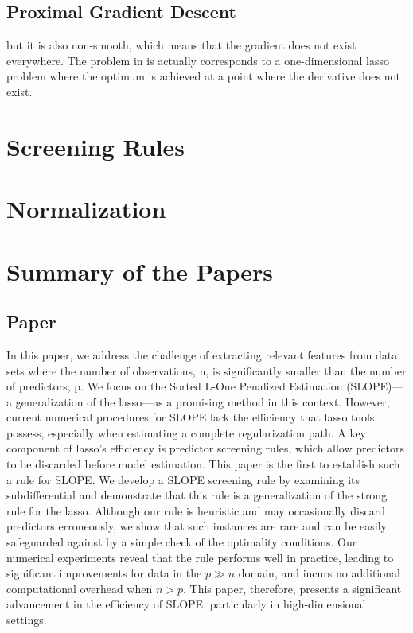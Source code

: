\subsection{Proximal Gradient Descent}

but it is also non-smooth, which means that the gradient does not exist everywhere. The problem in  is actually corresponds to a one-dimensional lasso problem where the optimum is achieved at a point where the derivative does not exist.


\section{Screening Rules}\label{sec:screening-rules}

\section{Normalization}

\section{Summary of the Papers}

\subsection{Paper \I}

In this paper, we address the challenge of extracting relevant features from data sets where the number of observations, n, is significantly smaller than the number of predictors, p. We focus on the Sorted L-One Penalized Estimation (SLOPE)—a generalization of the lasso—as a promising method in this context. However, current numerical procedures for SLOPE lack the efficiency that lasso tools possess, especially when estimating a complete regularization path. A key component of lasso's efficiency is predictor screening rules, which allow predictors to be discarded before model estimation. This paper is the first to establish such a rule for SLOPE. We develop a SLOPE screening rule by examining its subdifferential and demonstrate that this rule is a generalization of the strong rule for the lasso. Although our rule is heuristic and may occasionally discard predictors erroneously, we show that such instances are rare and can be easily safeguarded against by a simple check of the optimality conditions. Our numerical experiments reveal that the rule performs well in practice, leading to significant improvements for data in the \(p \gg n\) domain, and incurs no additional computational overhead when \(n > p\). This paper, therefore, presents a significant advancement in the efficiency of SLOPE, particularly in high-dimensional settings.

